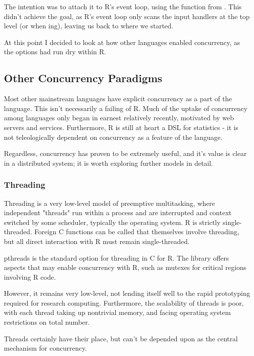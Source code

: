 The intention was to attach it to R's event loop, using the  function from .
This didn't achieve the goal, as R's event loop only scans the input handlers at the top level (or when ing), leaving us back to where we started.

At this point I decided to look at how other languages enabled concurrency, as the options had run dry within R.

\subsection{Other Concurrency Paradigms}

Most other mainstream languages have explicit concurrency as a part of the language.
This isn't necessarily a failing of R.
Much of the uptake of concurrency among languages only began in earnest relatively recently, motivated by web servers and services.
Furthermore, R is still at heart a DSL for statistics - it is not teleologically dependent on concurrency as a feature of the language.

Regardless, concurrency has proven to be extremely useful, and it's value is clear in a distributed system;
it is worth exploring further models in detail.

\subsubsection{Threading}

Threading is a very low-level model of preemptive multitasking, where independent "threads" run within a process and are interrupted and context switched by some scheduler, typically the operating system.
R is strictly single-threaded.
Foreign C functions can be called that themselves involve threading, but all direct interaction with R must remain single-threaded.

pthreads\cite{nichols1996pthreads} is the standard option for threading in C for R.
The library offers aspects that may enable concurrency with R, such as mutexes for critical regions involving R code.

However, it remains very low-level, not lending itself well to the rapid prototyping required for research computing.
Furthermore, the scalability of threads is poor, with each thread taking up nontrivial memory, and facing operating system restrictions on total number.

Threads certainly have their place, but can't be depended upon as the central mechanism for concurrency.

